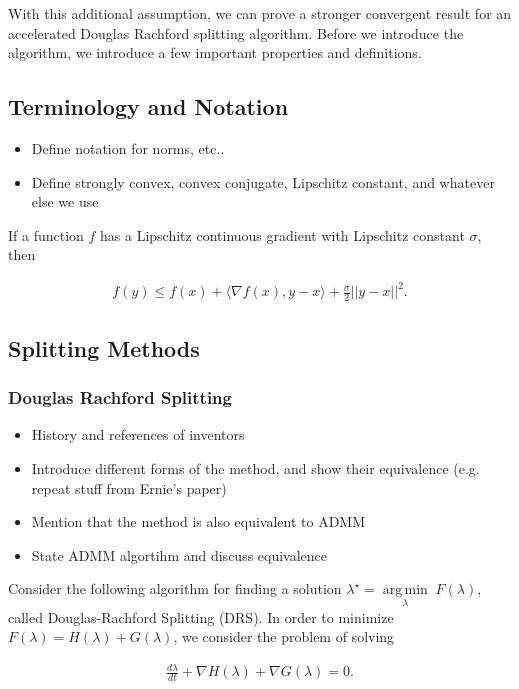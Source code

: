 \documentclass[11pt]{article}
\newcommand{\inner}[2]{\langle #1, #2\rangle}
\newcommand{\argmin}[1]{\underset{#1}{\operatorname{arg\,min}}\;}
\def\grad {{\nabla}}
\begin{document}
\noindent With this additional assumption, we can prove a stronger
convergent result for an accelerated Douglas Rachford splitting
algorithm.  Before we introduce the algorithm, we introduce a few
important properties and definitions.

\subsection{Terminology and Notation}

\begin{itemize}
\item Define notation for norms, etc..
\item Define strongly convex, convex conjugate, Lipschitz constant, and whatever else we use
\end{itemize}

If a function $f$ has a Lipschitz continuous gradient with Lipschitz
constant $\sigma$, then

\begin{align}
f(y) \le f(x) + \inner{\grad f(x)}{y-x} + \frac {\sigma}2 ||y-x||^2. \label{prop:lipschitzcontgrad}
\end{align}

\subsection{Splitting Methods}

\subsubsection{Douglas Rachford Splitting}
\begin{itemize}
\item History and references of inventors
\item Introduce different forms of the method, and show their equivalence (e.g. repeat stuff from Ernie's paper)
\item Mention that the method is also equivalent to ADMM
\item State ADMM algortihm and discuss equivalence
\end{itemize}

\noindent Consider the following algorithm for finding a solution
$\lambda^\star = \argmin \lambda F(\lambda)$, called Douglas-Rachford
Splitting (DRS).  In order to minimize $F(\lambda) = H(\lambda) +
G(\lambda)$, we consider the problem of solving

\begin{align}
\frac {d\lambda}{dt} + \grad H(\lambda) + \grad G(\lambda) = 0.
\end{align}
\end{document}
